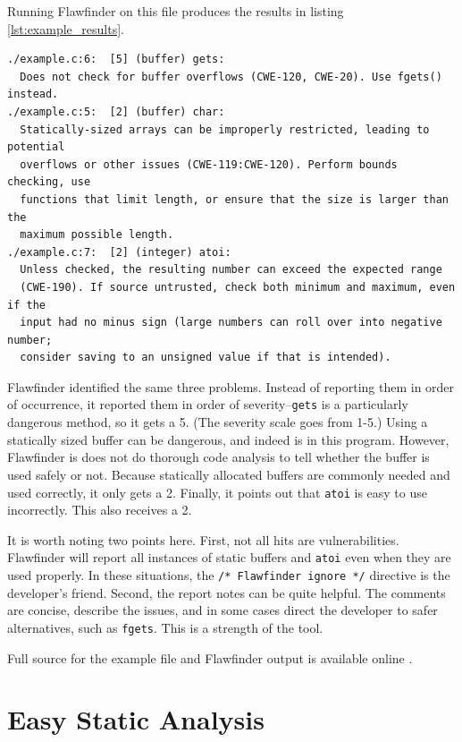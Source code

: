 \documentclass[journal]{IEEEtran}
\def\tt#1{\mbox{\texttt{#1}}}
\begin{document}
Running Flawfinder on this file produces the results in listing \ref{lst:example_results}.

\begin{lstlisting}[caption=Example Flawfinder Results, label=lst:example_results]
./example.c:6:  [5] (buffer) gets:
  Does not check for buffer overflows (CWE-120, CWE-20). Use fgets() instead.
./example.c:5:  [2] (buffer) char:
  Statically-sized arrays can be improperly restricted, leading to potential
  overflows or other issues (CWE-119:CWE-120). Perform bounds checking, use
  functions that limit length, or ensure that the size is larger than the
  maximum possible length.
./example.c:7:  [2] (integer) atoi:
  Unless checked, the resulting number can exceed the expected range
  (CWE-190). If source untrusted, check both minimum and maximum, even if the
  input had no minus sign (large numbers can roll over into negative number;
  consider saving to an unsigned value if that is intended).
\end{lstlisting}

Flawfinder identified the same three problems. Instead of reporting them in order of occurrence, it
reported them in order of severity--\tt{gets} is a particularly dangerous method, so it gets a 5.
(The severity scale goes from 1-5.) Using a statically sized buffer can be dangerous, and indeed is
in this program. However, Flawfinder is does not do thorough code analysis to tell whether the
buffer is used safely or not. Because statically allocated buffers are commonly needed and used
correctly, it only gets a 2. Finally, it points out that \tt{atoi} is easy to use incorrectly. This
also receives a 2.

It is worth noting two points here. First, not all hits are vulnerabilities. Flawfinder will report
all instances of static buffers and \tt{atoi} even when they are used properly. In these situations,
the \tt{/* Flawfinder ignore */} directive is the developer's friend. Second, the report notes can
be quite helpful. The comments are concise, describe the issues, and in some cases direct the
developer to safer alternatives, such as \tt{fgets}. This is a strength of the tool.

Full source for the example file and Flawfinder output is available online \cite{this_repo}.

\section{Easy Static Analysis}
\end{document}
